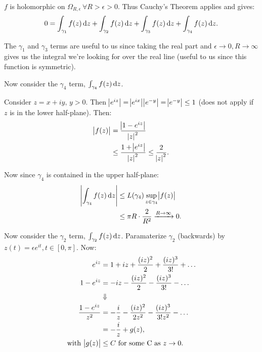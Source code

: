 \begin{example}
\begin{center}
\end{center}


$f$ is holomorphic on $\Omega_{R,\epsilon} \, \forall R > \epsilon >0 $. Thus Cauchy's Theorem applies and gives:
\begin{align*}
    0 = \int_{\gamma_1} f(z) \dif z +\int_{\gamma_2} f(z) \dif z +\int_{\gamma_3} f(z) \dif z +\int_{\gamma_4} f(z) \dif z .
\end{align*}

The $\gamma_1$ and $\gamma_3$ terms are useful to us since taking the real part and $\epsilon \to 0, R \to \infty$ gives us the integral we're looking for over the real line (useful to us since this function is symmetric).

Now consider the $\gamma_4$ term, $\int_{\gamma_4} f(z) \dif z $.

Consider $z=x+iy, \, y>0 $. Then $\abs{e^{iz}} = \abs{e^{ix}} \abs{ e^{-y}} = \abs{ e^{-y}} \leq 1 $ (does not apply if $z$ is in the lower half-plane). Then:
\begin{align*}
    \abs{f(z)} &= \frac{\abs{1-e^{iz}}}{\abs{z}^2}\\
    & \leq \frac{1+\abs{e^{iz}}}{\abs{z}^2} \leq \frac{2}{\abs{z}^2}.
\end{align*}

Now since $\gamma_4$ is contained in the upper half-plane:
\begin{align*}
   \abs{ \int_{\gamma_4} f(z) \dif z } &\leq L(\gamma_4) \sup_{z\in \gamma_4} \abs{f(z)}\\
   &\leq \pi R \cdot \frac{2}{R^2} \xrightarrow[]{R\to \infty} 0.
\end{align*}


Now consider the $\gamma_2$ term, $\int_{\gamma_2} f(z) \dif z $. Paramaterize $\gamma_2$ (backwards) by $z(t) = \epsilon e^{it}, t\in [0,\pi]$. Now:
\begin{align*}
    e^{iz} &= 1 + iz + \frac{(iz)^2}{2} + \frac{(iz)^3}{3!} + \hdots\\
   1- e^{iz}  &=  -iz - \frac{(iz)^2}{2} - \frac{(iz)^3}{3!} - \hdots\\
   &\Downarrow\\
   \frac{ 1- e^{iz}}{ z^2} &= - \frac{i}{z} - \frac{(iz)^2}{2z^2} - \frac{(iz)^3}{3!z^2} - \hdots\\
   &= - \frac{i}{z} + g(z),\\
   \text{with } \abs{g(z)} &\leq C \text{ for some C as } z \to 0.
\end{align*}


\end{example}
